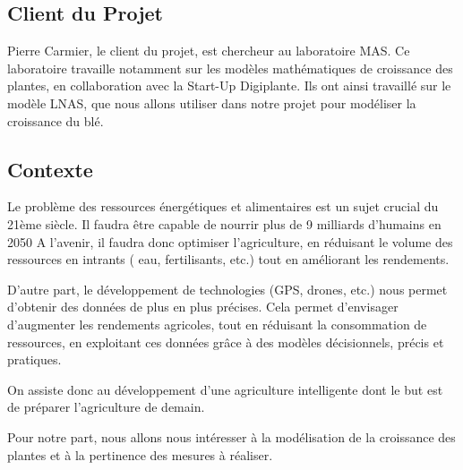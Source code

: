 \subsection{Client du Projet}
Pierre Carmier, le client du projet, est chercheur au laboratoire MAS. Ce laboratoire travaille notamment sur les modèles mathématiques de croissance des plantes, en collaboration avec la Start-Up Digiplante. Ils ont ainsi travaillé sur le modèle LNAS, que nous allons utiliser dans notre projet pour modéliser la croissance du blé.
\subsection{Contexte}
Le problème des ressources énergétiques et alimentaires est un sujet crucial du  21ème siècle. Il faudra être capable de nourrir plus de 9 milliards d'humains en 2050
A l'avenir, il faudra donc optimiser l'agriculture, en réduisant le volume des ressources en intrants ( eau, fertilisants, etc.) tout en améliorant les rendements.

D'autre part, le développement de technologies (GPS, drones, etc.) nous permet d'obtenir des données de plus en plus précises. 
Cela permet d'envisager d'augmenter les rendements agricoles, tout en réduisant la consommation de ressources, en exploitant ces données grâce à des modèles décisionnels, précis et pratiques. 

On assiste donc au développement d'une agriculture intelligente dont le but est de préparer
l'agriculture de demain.

Pour notre part, nous allons nous intéresser à la modélisation de la croissance des plantes et à la pertinence des mesures à réaliser.
